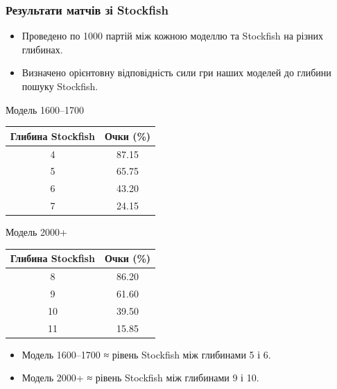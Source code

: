 \documentclass[
    10pt,
]{beamer}
\begin{document}
\begin{frame}[t]
    \frametitle{Результати матчів зі Stockfish}

    \begin{itemize}
        \item Проведено по 1000 партій між кожною моделлю та Stockfish на різних глибинах.
        \item Визначено орієнтовну відповідність сили гри наших моделей до глибини пошуку Stockfish.
    \end{itemize}

    \vspace{2mm}

    \begin{minipage}{0.48\textwidth}
        \centering
        {Модель 1600--1700} \\
        \scriptsize
        \begin{tabular}{|c|c|}
            \hline
            Глибина Stockfish & Очки (\%) \\
            \hline
            4 & 87.15 \\
            5 & 65.75 \\
            6 & 43.20 \\
            7 & 24.15 \\
            \hline
        \end{tabular}
    \end{minipage}
    \hfill
    \begin{minipage}{0.48\textwidth}
        \centering
        {Модель 2000+} \\
        \scriptsize
        \begin{tabular}{|c|c|}
            \hline
            Глибина Stockfish & Очки (\%) \\
            \hline
            8  & 86.20 \\
            9  & 61.60 \\
            10 & 39.50 \\
            11 & 15.85 \\
            \hline
        \end{tabular}
    \end{minipage}

    \vspace{4mm}

    \begin{itemize}
        \item Модель 1600--1700 ≈ рівень Stockfish між глибинами 5 і 6.
        \item Модель 2000+ ≈ рівень Stockfish між глибинами 9 і 10.
    \end{itemize}
\end{frame}
\end{document}
